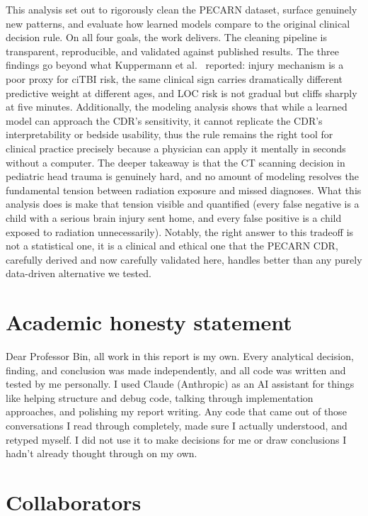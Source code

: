 \documentclass[11pt,letterpaper]{article}
\begin{document}
This analysis set out to rigorously clean the PECARN dataset, surface genuinely new patterns, and evaluate how learned models compare to the original clinical decision rule. On all four goals, the work delivers. The cleaning pipeline is transparent, reproducible, and validated against published results. The three findings go beyond what Kuppermann et al.~\cite{kuppermann2009} reported: injury mechanism is a poor proxy for ciTBI risk, the same clinical sign carries dramatically different predictive weight at different ages, and LOC risk is not gradual but cliffs sharply at five minutes. Additionally, the modeling analysis shows that while a learned model can approach the CDR's sensitivity, it cannot replicate the CDR's interpretability or bedside usability, thus the rule remains the right tool for clinical practice precisely because a physician can apply it mentally in seconds without a computer. The deeper takeaway is that the CT scanning decision in pediatric head trauma is genuinely hard, and no amount of modeling resolves the fundamental tension between radiation exposure and missed diagnoses. What this analysis does is make that tension visible and quantified (every false negative is a child with a serious brain injury sent home, and every false positive is a child exposed to radiation unnecessarily). Notably, the right answer to this tradeoff is not a statistical one, it is a clinical and ethical one that the PECARN CDR, carefully derived and now carefully validated here, handles better than any purely data-driven alternative we tested.

\section{Academic honesty statement}\label{academic-honesty-statement} 

Dear Professor Bin, all work in this report is my own. Every analytical decision, finding, and conclusion was made independently, and all code was written and tested by me personally. I used Claude (Anthropic) as an AI assistant for things like helping structure and debug code, talking through implementation approaches, and polishing my report writing. Any code that came out of those conversations  I read through completely, made sure I actually understood, and retyped myself. I did not use it to make decisions for me or draw conclusions I hadn't already thought through on my own.

\section{Collaborators}\label{collaborators}
\end{document}
